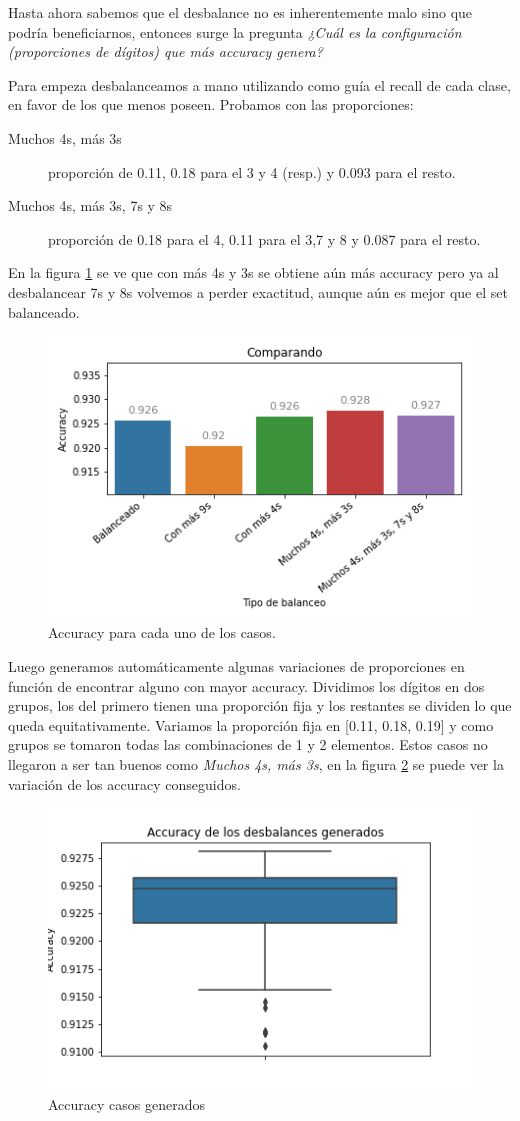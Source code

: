 \FloatBarrier
Hasta ahora sabemos que el desbalance no es inherentemente malo sino que podría beneficiarnos, entonces surge la pregunta \textit{¿Cuál es la configuración (proporciones de dígitos) que más accuracy genera?}

Para empeza desbalanceamos a mano utilizando como guía el recall de cada clase, en favor de los que menos poseen. Probamos con las proporciones: 

\begin{description}
 \item [Muchos 4s, más 3s] proporción de 0.11, 0.18 para el 3 y 4 (resp.) y 0.093 para el resto. 
 \item [Muchos 4s, más 3s, 7s y 8s] proporción de 0.18 para el 4, 0.11 para el 3,7 y 8 y 0.087 para el resto. 
\end{description}

En la figura \ref{fig:acc} se ve que con más 4s y 3s se obtiene aún más accuracy pero ya al desbalancear 7s y 8s volvemos a perder exactitud, aunque aún es mejor que el set balanceado.
\begin{figure}[h]
 \centering
 \includegraphics[width=0.65\linewidth]{images/balanceo/acc.png}
 \caption{Accuracy para cada uno de los casos.}
 \label{fig:acc}
\end{figure}

Luego generamos automáticamente algunas variaciones de proporciones en función de encontrar alguno con mayor accuracy. Dividimos los dígitos en dos grupos, los del primero tienen una proporción fija y los restantes se dividen lo que queda equitativamente. Variamos la proporción fija en [0.11, 0.18, 0.19] y como grupos se tomaron todas las combinaciones de 1 y 2 elementos. Estos casos no llegaron a ser tan buenos como \textit{Muchos 4s, más 3s}, en la figura \ref{fig:accAutom} se puede ver la variación de los accuracy conseguidos.

\begin{figure}[h]
 \centering
 \includegraphics[width=0.65\linewidth]{images/balanceo/acc_generados.png}
 \caption{Accuracy casos generados}
 \label{fig:accAutom}
\end{figure}

\FloatBarrier

